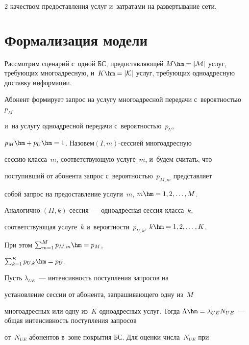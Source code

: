 \begin{multicols}{2}
качеством предостав\-ле\-ния услуг и~за\-тра\-та\-ми на развертывание сети.



\vspace*{-6pt}

  

\section{Формализация модели}



  Рассмотрим сценарий с~одной БС, предоставляющей $M\hm= \vert 

\mathcal{M}\vert$ услуг, тре\-бу\-ющих многоадресную, и~$K\hm= 

\vert\mathcal{K}\vert$ услуг, тре\-бу\-ющих одноадресную доставку информации. 

Абонент формирует запрос на услугу многоадресной передачи с~ве\-ро\-ят\-ностью~$p_M$ 

  и~на услугу одноадресной передачи с~ве\-ро\-ят\-ностью~$p_U$, 

$p_M\hm+p_U\hm=1$. Назовем\linebreak $({I}, m)$-сес\-си\-ей многоадресную 

сессию класса~$m$, со\-от\-вет\-ст\-ву\-ющую услуге~$m$, и~будем считать, что 

по\-сту\-пив\-ший от абонента запрос с~ве\-ро\-ят\-ностью~$p_{M,m}$ пред\-став\-ля\-ет 

собой запрос на предостав\-ле\-ние услуги~$m$, $m\hm= 1,2,\ldots , M$. 

Аналогично $({II}, k)$-сес\-сия~--- одноадресная сессия класса~$k$, 

со\-от\-вет\-ст\-ву\-ющая услуге~$k$ и~ве\-ро\-ят\-ности~$p_{U,k}$, $k\hm= 1,2,\ldots, K$. 

При этом $\sum\nolimits^M_{m=1} p_{M,m} \hm= p_M$, 

$\sum\nolimits^K_{k=1} p_{U,k} \hm= p_U$.

  

  Пусть $\lambda_{UE}$~--- интенсивность поступления запросов на 

установление сессии от абонента, запрашивающего одну из~$M$ 

многоадресных или одну из~$K$ одноадресных услуг. Тогда $\Lambda\hm= 

\lambda_{UE}N_{UE}$~--- общая ин\-тен\-сив\-ность по\-ступ\-ле\-ния запросов 

от~$N_{UE}$ абонентов в~зоне покрытия БС. Для оценки числа~$N_{UE}$ при 


\end{multicols}
